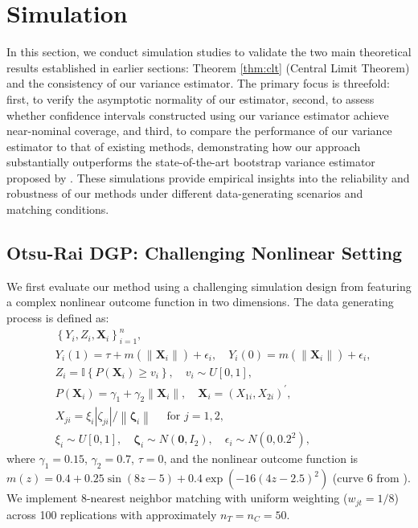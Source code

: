\documentclass{mytemplate}
\begin{document}
\section{Simulation}
In this section, we conduct simulation studies to validate the two main theoretical results established in earlier sections: Theorem \ref{thm:clt} (Central Limit Theorem) and the consistency of our variance estimator. The primary focus is threefold: first, to verify the asymptotic normality of our estimator, second, to assess whether confidence intervals constructed using our variance estimator achieve near-nominal coverage, and third, to compare the performance of our variance estimator to that of existing methods, demonstrating how our approach substantially outperforms the state-of-the-art bootstrap variance estimator proposed by \cite{otsu2017bootstrap}. These simulations provide empirical insights into the reliability and robustness of our methods under different data-generating scenarios and matching conditions.

\subsection{Otsu-Rai DGP: Challenging Nonlinear Setting}

We first evaluate our method using a challenging simulation design from \cite{otsu2017bootstrap} featuring a complex nonlinear outcome function in two dimensions. The data generating process is defined as:
\begin{align*} 
&\left\{Y_i, Z_i, \mathbf{X}_i\right\}_{i=1}^n, \\ 
& Y_i(1)=\tau+m\left(\left\|\mathbf{X}_i\right\|\right)+\epsilon_i, \quad Y_i(0)=m\left(\left\|\mathbf{X}_i\right\|\right)+\epsilon_i, \\ 
& Z_i=\mathbb{I}\left\{P\left(\mathbf{X}_i\right) \geq v_i\right\}, \quad v_i \sim U[0,1], \\ 
& P\left(\mathbf{X}_i\right)=\gamma_1+\gamma_2\left\|\mathbf{X}_i\right\|, \quad \mathbf{X}_i=\left(X_{1 i}, X_{2 i}\right)^{\prime}, \\ 
& X_{j i}=\xi_i\left|\zeta_{j i}\right| /\left\|\boldsymbol{\zeta}_i\right\| \quad \text { for } j=1, 2, \\ 
& \xi_i \sim U[0,1], \quad \boldsymbol{\zeta}_i \sim N\left(\mathbf{0}, I_2\right), \quad \epsilon_i \sim N\left(0,0.2^2\right),
\end{align*}
where $\gamma_1 = 0.15$, $\gamma_2 = 0.7$, $\tau = 0$, and the nonlinear outcome function is $m(z) = 0.4 + 0.25\sin(8z-5) + 0.4\exp(-16(4z-2.5)^2)$ (curve 6 from \cite{otsu2017bootstrap}). We implement 8-nearest neighbor matching with uniform weighting ($w_{jt} = 1/8$) across 100 replications with approximately $n_T = n_C = 50$.
\end{document}
